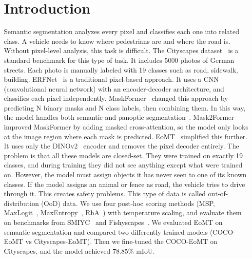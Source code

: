 \section{Introduction}
\label{sec:intro}

Semantic segmentation analyzes every pixel and classifies each one into related class. 
A vehicle needs to know where pedestrians are and where the road is. Without pixel-level analysis, this task is difficult. 
The Cityscapes dataset~\cite{cityscapes} is a standard benchmark for this type of task. It includes 5000 photos of German streets. 
Each photo is manually labeled with 19 classes such as road, sidewalk, building.
ERFNet~\cite{erfnet} is a traditional pixel-based approach. 
It uses a CNN (convolutional neural network) with an encoder-decoder architecture, and classifies each pixel independently.
MaskFormer~\cite{maskformer} changed this approach by predicting N binary masks and N class labels, then combining them. 
In this way, the model handles both semantic and panoptic segmentation~\cite{panoptic}. 
Mask2Former~\cite{mask2former} improved MaskFormer by adding masked cross-attention, so the model only looks at the image region where each mask is predicted. 
EoMT~\cite{eomt} simplified this further. It uses only the DINOv2~\cite{dinov2} encoder and removes the pixel decoder entirely.
The problem is that all these models are closed-set. 
They were trained on exactly 19 classes, and during training they did not see anything except what were trained on. 
However, the model must assign objects it has never seen to one of its known classes. 
If the model assigns an animal or fence as road, the vehicle tries to drive through it. This creates safety problems. 
This type of data is called out-of-distribution (OoD) data. 
We use four post-hoc scoring methods (MSP, MaxLogit~\cite{maxlogit}, MaxEntropy~\cite{maxentropy}, RbA~\cite{rba}) with temperature scaling, and evaluate them on benchmarks from SMIYC~\cite{smiyc} and Fishyscapes~\cite{fishyscapes}.
We evaluated EoMT on semantic segmentation and compared two differently trained models (COCO-EoMT vs Cityscapes-EoMT).
Then we fine-tuned the COCO-EoMT on Cityscapes, and the model achieved 78.85\% mIoU. 

